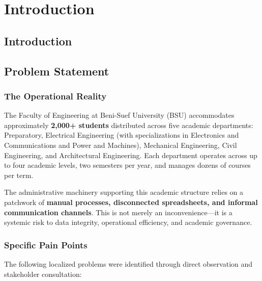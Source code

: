 
\chapter{Introduction}
\label{chap:intro}
\newpage
\section*{Introduction}


\section{Problem Statement}
\label{sec:problem-statement}

\subsection{The Operational Reality}

The Faculty of Engineering at Beni-Suef University (BSU) accommodates approximately \textbf{2,000+ students} distributed across five academic departments: Preparatory, Electrical Engineering (with specializations in Electronics and Communications and Power and Machines), Mechanical Engineering, Civil Engineering, and Architectural Engineering. Each department operates across up to four academic levels, two semesters per year, and manages dozens of courses per term.

The administrative machinery supporting this academic structure relies on a patchwork of \textbf{manual processes, disconnected spreadsheets, and informal communication channels}. This is not merely an inconvenience---it is a systemic risk to data integrity, operational efficiency, and academic governance.

\subsection{Specific Pain Points}

The following localized problems were identified through direct observation and stakeholder consultation:

